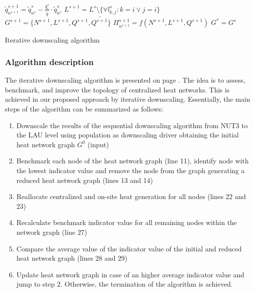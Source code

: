{\begin{algorithm}[H]
{{{					$\tilde{q}^{s+1}_{n^{s+1}} = \tilde{q}^{s}_{n^{s}}-\frac{q^{s}_{i}}{\tilde{q}} \cdot \tilde{q}^{s}_{n^{s}}$}
				$L^{s+1}=L^{s} \setminus \{\forall l^{s}_{k,j}: k=i \lor j=i\}$
				$G^{s+1}=\{N^{s+1}, L^{s+1}, Q^{s+1}, \tilde{Q^{s+1}\}}$
				$\Pi^{s+1}_{n^{s+1}}=f(N^{s+1}, L^{s+1}, Q^{s+1})$
				}
			$G^{*} = G^{s}$
		}
		\caption{Iterative downscaling algorithm}
		\label{Alg:2}
	\end{algorithm}
}

\subsubsection{Algorithm description}
The iterative downscaling algorithm is presented on page \pageref{Alg:2}. The idea is to assess, benchmark, and improve the topology of centralized heat networks. This is achieved in our proposed approach by iterative downscaling. Essentially, the main steps of the algorithm can be summarized as follows:

\begin{enumerate}[nolistsep]
	\item Downscale the results of the sequential downscaling algorithm from NUT3 to the LAU level using population as downscaling driver obtaining the initial heat network graph $G^{0}$ (input)
	\item Benchmark each node of the heat network graph (line 11), identify node with the lowest indicator value and remove the node from the graph generating a reduced heat network graph (lines 13 and 14)
	\item Reallocate centralized and on-site heat generation for all nodes (lines 22 and 23)
	\item Recalculate benchmark indicator value for all remaining nodes within the network graph (line 27)
	\item Compare the average value of the indicator value of the initial and reduced heat network graph (lines 28 and 29)
	\item Update heat network graph in case of an higher average indicator value and jump to step 2. Otherwise, the termination of the algorithm is achieved. 
\end{enumerate}
\vspace{0.5cm}

